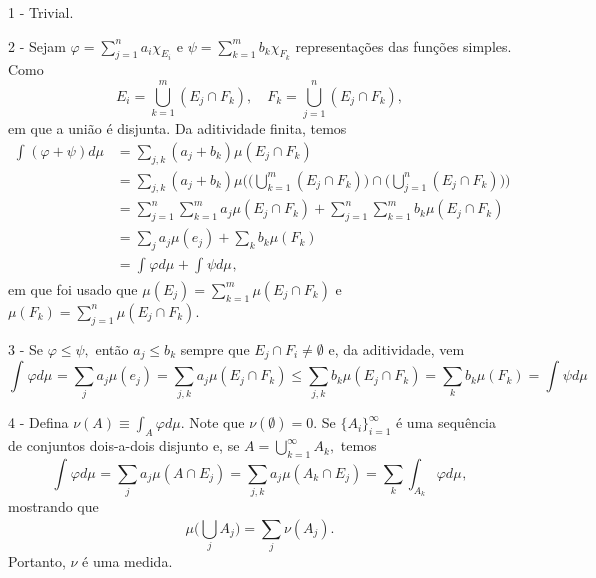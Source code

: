 \documentclass[MeasureTheory/measure_theory.tex]{subfiles}
\begin{document}
\begin{proof*}
	1 - Trivial.

	2 - Sejam \(\varphi  = \sum\limits_{j=1}^{n}a_{i}\chi_{E_{i}}\) e \(\psi = \sum\limits_{k=1}^{m}b_{k}\chi_{F_{k}}\)  representações das funções simples. Como
	\[
		E_{i} = \bigcup_{k=1}^{m}(E_{j}\cap F_{k}), \quad F_{k} = \bigcup_{j=1}^{n}(E_{j}\cap F_{k}),
	\]
	em que a união é disjunta. Da aditividade finita, temos
	\begin{align*}
		\int_{}(\varphi +\psi) d\mu_{} & = \sum\limits_{j, k}^{}(a_{j} + b_{k})\mu (E_{j}\cap F_{k})                                                                                                   \\
		                               & = \sum\limits_{j, k}^{}(a_{j} + b_{k})\mu \biggl(\biggl(\bigcup_{k=1}^{m}(E_{j}\cap F_{k})\biggr)\cap \biggl(\bigcup_{j=1}^{n}(E_{j}\cap F_{k})\biggr)\biggr) \\
		                               & = \sum\limits_{j=1}^{n}\sum\limits_{k=1}^{m}a_{j}\mu (E_{j}\cap F_{k}) + \sum\limits_{j=1}^{n}\sum\limits_{k=1}^{m}b_{k}\mu (E_{j}\cap F_{k})                 \\
		                               & = \sum\limits_{j}^{}a_{j}\mu (e_{j}) + \sum\limits_{k}^{}b_{k}\mu (F_{k})                                                                                     \\
		                               & = \int_{}\varphi  d\mu_{} + \int_{}\psi d\mu_{},
	\end{align*}
	em que foi usado que \(\mu (E_{j}) = \sum\limits_{k=1}^{m}\mu (E_{j}\cap F_{k})\) e \(\mu (F_{k}) = \sum\limits_{j=1}^{n}\mu (E_{j}\cap F_{k})\).

	3 - Se \(\varphi \leq \psi,\) então \(a_{j}\leq b_{k}\) sempre que \(E_{j}\cap F_{i}\neq\emptyset\) e, da aditividade, vem
	\[
		\int_{}\varphi  d\mu_{} = \sum\limits_{j}^{}a_{j}\mu (e_{j}) = \sum\limits_{j, k}^{}a_{j}\mu (E_{j}\cap F_{k}) \leq \sum\limits_{j, k}^{}b_{k}\mu (E_{j}\cap F_{k}) = \sum\limits_{k}^{}b_{k}\mu (F_{k}) = \int_{}\psi d\mu_{}
	\]

	4 - Defina \(\nu(A)\equiv \int_{A}^{}\varphi d\mu .\) Note que \(\nu(\emptyset )=0.\) Se \(\{A_{i}\}_{i=1}^{\infty}\) é uma sequência de conjuntos dois-a-dois disjunto e, se \(A = \bigcup_{k=1}^{\infty}A_{k},\) temos
	\[
		\int_{}\varphi  d\mu_{} = \sum\limits_{j}^{}a_{j}\mu (A\cap E_{j}) = \sum\limits_{j, k}^{}a_{j}\mu (A_{k}\cap E_{j}) = \sum\limits_{k}^{}\int_{A_{k}}\varphi  d\mu_{},
	\]
	mostrando que
	\[
		\mu \biggl(\bigcup_{j}^{}A_{j}\biggr) = \sum\limits_{j}^{}\nu(A_{j}).
	\]
	Portanto, \(\nu\) é uma medida. \qedsymbol
\end{proof*}
\end{document}
